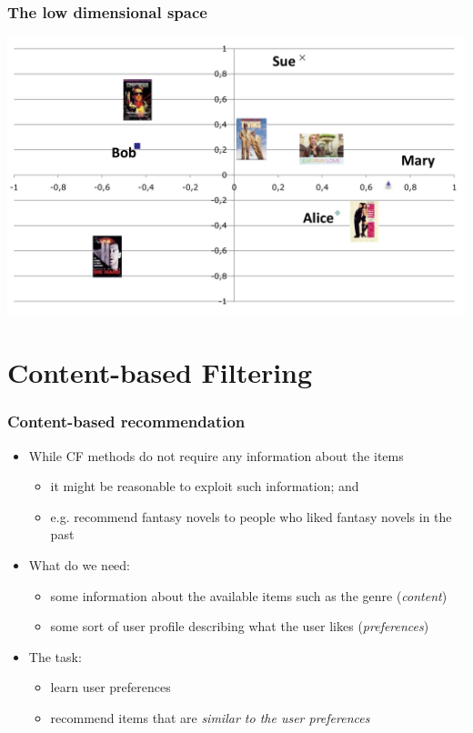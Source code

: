 \documentclass{beamer}
\begin{document}
\begin{frame}
    \frametitle{The low dimensional space}
    \centering
    \includegraphics[width=\linewidth]{svdpic}
\end{frame}

\section{Content-based Filtering}

\begin{frame}
    \frametitle{Content-based recommendation}
    \begin{itemize}
    \item While CF methods do not require any information about the items
        \begin{itemize}
        \item it might be reasonable to exploit such information; and
        \item e.g. recommend fantasy novels to people who liked fantasy novels
            in the past
        \end{itemize}
    \item What do we need:
        \begin{itemize}
        \item some information about the available items such as the genre
            (\emph{content})
        \item some sort of user profile describing what the user likes
            (\emph{preferences})
        \end{itemize}
    \item The task:
        \begin{itemize}
        \item learn user preferences
        \item recommend items that are \emph{similar to the user preferences}
        \end{itemize}
    \end{itemize}
\end{frame}
\end{document}
